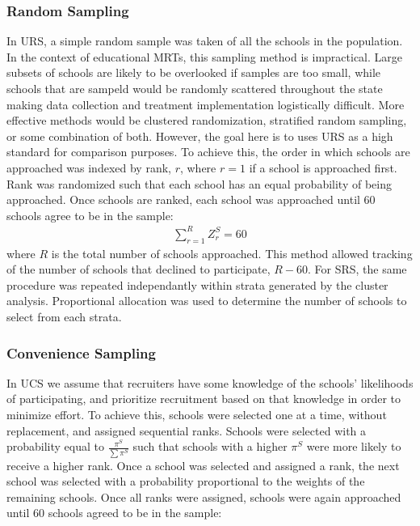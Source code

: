 \documentclass[man,floatsintext]{apa6}
\begin{document}
\hypertarget{random-sampling}{%
\subsubsection{Random Sampling}\label{random-sampling}}

In URS, a simple random sample was taken of all the schools in the population. In the context of educational MRTs, this sampling method is impractical. Large subsets of schools are likely to be overlooked if samples are too small, while schools that are sampeld would be randomly scattered throughout the state making data collection and treatment implementation logistically difficult. More effective methods would be clustered randomization, stratified random sampling, or some combination of both. However, the goal here is to uses URS as a high standard for comparison purposes. To achieve this, the order in which schools are approached was indexed by rank, \(r\), where \(r = 1\) if a school is approached first. Rank was randomized such that each school has an equal probability of being approached. Once schools are ranked, each school was approached until 60 schools agree to be in the sample:
\begin{align} \label{eq:rankRS}
  \sum_{r=1}^R{Z^S_r} = 60
\end{align}
where \(R\) is the total number of schools approached. This method allowed tracking of the number of schools that declined to participate, \(R - 60\). For SRS, the same procedure was repeated independantly within strata generated by the cluster analysis. Proportional allocation was used to determine the number of schools to select from each strata.

\hypertarget{convenience-sampling}{%
\subsubsection{Convenience Sampling}\label{convenience-sampling}}

In UCS we assume that recruiters have some knowledge of the schools' likelihoods of participating, and prioritize recruitment based on that knowledge in order to minimize effort. To achieve this, schools were selected one at a time, without replacement, and assigned sequential ranks. Schools were selected with a probability equal to \(\frac{\pi^S}{\sum\pi^S}\) such that schools with a higher \(\pi^S\) were more likely to receive a higher rank. Once a school was selected and assigned a rank, the next school was selected with a probability proportional to the weights of the remaining schools. Once all ranks were assigned, schools were again approached until 60 schools agreed to be in the sample:
\end{document}
